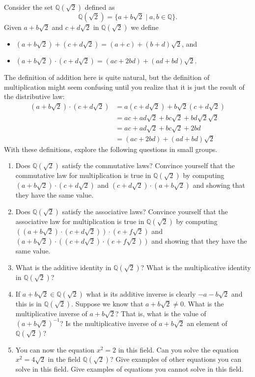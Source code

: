 \documentclass[11pt]{article}
\newenvironment{task}
	{\begin{mdframed}[linecolor=lightgray, linewidth=3pt]\raggedright}
	{\end{mdframed}}
\theoremstyle{definition}
\begin{document}
\begin{task}

  Consider the set $\mathbb{Q}(\sqrt{2})$ defined as
  \[ \mathbb{Q}(\sqrt{2}) = \{ a + b\sqrt{2} \mid a, b\in \mathbb{Q}\}. \]
  Given $a+b\sqrt{2}$ and $c+d\sqrt{2}$ in $\mathbb{Q}(\sqrt{2})$ we define
  \begin{itemize}
    \item $(a+b\sqrt{2})+(c+d\sqrt{2}) = (a+c) + (b+d)\sqrt{2}$, and
    \item $(a+b\sqrt{2})\cdot (c+d\sqrt{2}) = (ac + 2bd) + (ad +bd)\sqrt{2}$.
  \end{itemize}
  The definition of addition here is quite natural, but the definition of multiplication might seem confusing until you realize that it is just
  the result of the distributive law:
  \begin{align*}
    (a+b\sqrt{2})\cdot (c+d\sqrt{2}) &= a(c+d\sqrt{2}) + b\sqrt{2}(c+d\sqrt{2})\\
                                     &= ac + ad\sqrt{2} + bc\sqrt{2} + bd \sqrt{2}\sqrt{2}\\
                                     &= ac + ad\sqrt{2} + bc\sqrt{2} + 2bd\\
                                     &= (ac + 2bd) + (ad +bd)\sqrt{2}
  \end{align*}
  With these definitions, explore the following questions in small groups.
  \begin{enumerate}
    \item Does $\mathbb{Q}(\sqrt{2})$ satisfy the commutative laws? Convince yourself that the commutative law for multiplication is true in $\mathbb{Q}(\sqrt{2})$
      by computing $(a+b\sqrt{2})\cdot (c+d\sqrt{2})$ and $(c+d\sqrt{2})\cdot (a+b\sqrt{2})$ and showing that they have the same value.
    \item Does $\mathbb{Q}(\sqrt{2})$ satisfy the associative laws? Convince yourself that the associative law for multiplication is true in $\mathbb{Q}(\sqrt{2})$
      by computing $((a+b\sqrt{2})\cdot (c+d\sqrt{2}))\cdot (e + f\sqrt{2})$ and $(a+b\sqrt{2})\cdot ( (c+d\sqrt{2})\cdot (e+f\sqrt{2}) )$ and showing that 
      they have the same value.
    \item What is the additive identity in $\mathbb{Q}(\sqrt{2})$? What is the multiplicative identity in $\mathbb{Q}(\sqrt{2})$?
    \item If $a+b\sqrt{2}\in \mathbb{Q}(\sqrt{2})$ what is its additive inverse is clearly $-a-b\sqrt{2}$ and this is in $\mathbb{Q}(\sqrt{2})$. Suppose
      we know that $a+b\sqrt{2} \neq 0$. What is the multiplicative inverse of $a+b\sqrt{2}$? That is, what is the value of $(a+b\sqrt{2})^{-1}$? Is
      the multiplicative inverse of $a+b\sqrt{2}$ an element of $\mathbb{Q}(\sqrt{2})$?
    \item You can now the equation $x^2=2$ in this field. Can you solve the equation $x^2 = 4\sqrt{2}$ in the field $\mathbb{Q}(\sqrt{2})$? Give examples of other equations you can solve in this field.
      Give examples of equations you cannot solve in this field.
  \end{enumerate}

\end{task}
\end{document}
